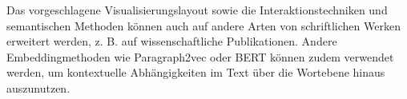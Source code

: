 Das vorgeschlagene Visualisierungslayout sowie die Interaktionstechniken und semantischen Methoden können auch auf andere Arten von schriftlichen Werken erweitert werden, z. B. auf wissenschaftliche Publikationen.
Andere Embeddingmethoden wie Paragraph2vec \cite{Le2014} oder BERT \cite{Devlin2018} können zudem verwendet werden, um kontextuelle Abhängigkeiten im Text über die Wortebene hinaus auszunutzen.
